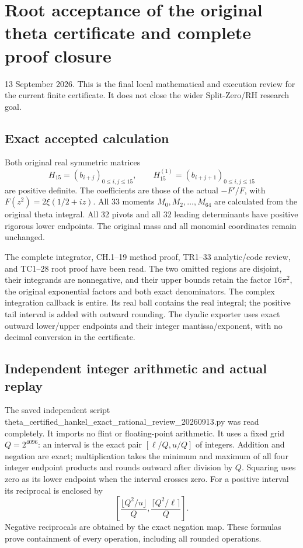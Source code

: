 \section{Root acceptance of the original theta certificate and complete proof closure}\label{C47stage:RootAcceptance:root-acceptance-of-the-original-theta-certificate-and-complete-proof-closure}

13 September 2026. This is the final local mathematical and execution review for the current finite certificate. It does not close the wider Split-Zero/RH research goal.

\subsection{Exact accepted calculation}\label{C47stage:RootAcceptance:exact-accepted-calculation}

Both original real symmetric matrices \[
H_{15}=(b_{i+j})_{0\le i,j\le15},\qquad
H_{15}^{(1)}=(b_{i+j+1})_{0\le i,j\le15}
\] are positive definite. The coefficients are those of the actual \(-F'/F\), with \(F(z^2)=2\xi(1/2+iz)\). All 33 moments \(M_0,M_2,\ldots,M_{64}\) are calculated from the original theta integral. All 32 pivots and all 32 leading determinants have positive rigorous lower endpoints. The original mass and all monomial coordinates remain unchanged.

The complete integrator, CH.1--19 method proof, TR1--33 analytic/code review, and TC1--28 root proof have been read. The two omitted regions are disjoint, their integrands are nonnegative, and their upper bounds retain the factor \(16\pi^2\), the original exponential factors and both exact denominators. The complex integration callback is entire. Its real ball contains the real integral; the positive tail interval is added with outward rounding. The dyadic exporter uses exact outward lower/upper endpoints and their integer mantissa/exponent, with no decimal conversion in the certificate.

\subsection{Independent integer arithmetic and actual replay}\label{C47stage:RootAcceptance:independent-integer-arithmetic-and-actual-replay}

The saved independent script theta\_certified\_hankel\_exact\_rational\_review\_20260913.py was read completely. It imports no flint or floating-point arithmetic. It uses a fixed grid \(Q=2^{4096}\): an interval is the exact pair \([\ell/Q,u/Q]\) of integers. Addition and negation are exact; multiplication takes the minimum and maximum of all four integer endpoint products and rounds outward after division by \(Q\). Squaring uses zero as its lower endpoint when the interval crosses zero. For a positive interval its reciprocal is enclosed by \[
\left[
\frac{\lfloor Q^2/u\rfloor}{Q},
\frac{\lceil Q^2/\ell\rceil}{Q}
\right].
\] Negative reciprocals are obtained by the exact negation map. These formulas prove containment of every operation, including all rounded operations.

